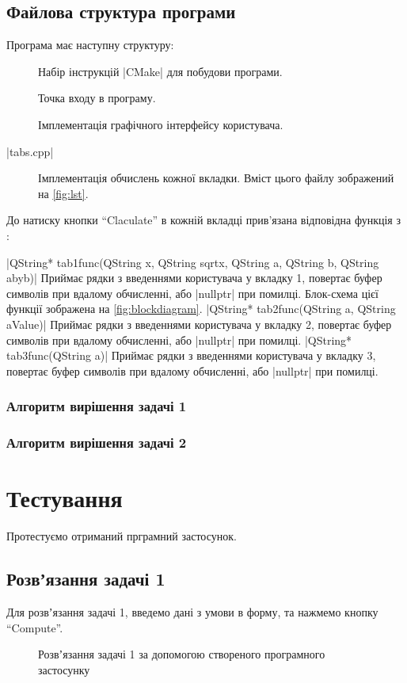 \documentclass[../../../../document]{subfiles}
\begin{document}
	\section{Файлова структура програми}
	Програма має наступну структуру:
	\begin{description}
		\item[]
			Набір інструкцій \textinline|CMake| для побудови програми. 
		\item[]
			Точка входу в програму. 
		\item[]
			Імплементація графічного інтерфейсу користувача. 
		\item[\textinline|tabs.cpp|]
			Імплементація обчислень кожної вкладки. Вміст цього файлу зображений на \cref{fig:lst}.
	\end{description}
	До натиску кнопки \enquote{Claculate} в кожній вкладці прив'язана відповідна функція з :
	\begin{funcDescription}
		|QString* tab1func(QString x, QString sqrtx, QString a, QString b, QString abyb)|
			Приймає рядки з введеннями користувача у вкладку 1, повертає буфер символів при
			вдалому обчисленні, або \cppinline|nullptr| при помилці. Блок-схема
			цієї функції зображена на \cref{fig:blockdiagram}.
		|QString* tab2func(QString a, QString aValue)|
			Приймає рядки з введеннями користувача у вкладку 2, повертає буфер символів при
			вдалому обчисленні, або \cppinline|nullptr| при помилці.
		|QString* tab3func(QString a)|
			Приймає рядки з введеннями користувача у вкладку 3, повертає буфер символів при
			вдалому обчисленні, або \cppinline|nullptr| при помилці.
	\end{funcDescription}
	
	\subsection{Алгоритм вирішення задачі 1}

	\subsection{Алгоритм вирішення задачі 2}

	\FloatBarrier
	\chapter{Тестування}
	Протестуємо отриманий прграмний застосунок. 
	\section{Розвʼязання задачі 1}
	Для розвʼязання задачі 1, введемо дані з умови в форму, та нажмемо кнопку \enquote{Compute}.
	\begin{figure}[h]
		\centering
		\caption{Розвʼязання задачі 1 за допомогою створеного програмного застосунку}%
		\label{fig:test1}
	\end{figure}
\end{document}
